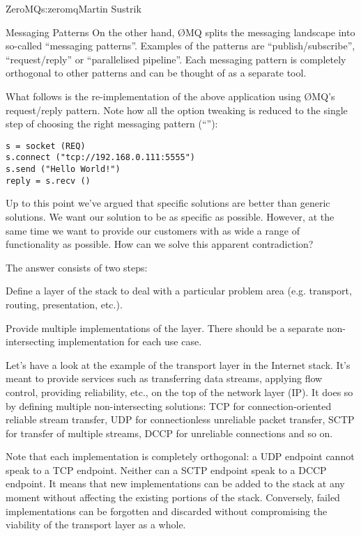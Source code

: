 \begin{aosachapter}{ZeroMQ}{s:zeromq}{Martin Sustrik}
\begin{aosasect1}{Messaging Patterns}
On the other hand, {\O}MQ splits the messaging landscape into so-called ``messaging
patterns''. Examples of the patterns are ``publish/subscribe'',
``request/reply'' or ``parallelised pipeline''. Each messaging pattern
is completely orthogonal to other patterns and can be thought of as a
separate tool.

What follows is the re-implementation of the above application using
{\O}MQ's request/reply pattern. Note how all the option tweaking is
reduced to the single step of choosing the right messaging pattern
(``''):

\begin{verbatim}
s = socket (REQ)
s.connect ("tcp://192.168.0.111:5555")
s.send ("Hello World!")
reply = s.recv ()
\end{verbatim}

Up to this point we've argued that specific solutions are better than
generic solutions. We want our solution to be as specific as
possible. However, at the same time we want to provide our customers
with as wide a range of functionality as possible. How can we solve this
apparent contradiction?

The answer consists of two steps:

\begin{aosaenumerate}

\item Define a layer of the stack to deal with a particular problem
  area (e.g. transport, routing, presentation, etc.).

\item Provide multiple implementations of the layer. There should be a
  separate non-intersecting implementation for each use case.

\end{aosaenumerate}

Let's have a look at the example of the transport layer in the
Internet stack. It's meant to provide services such as transferring
data streams, applying flow control, providing reliability, etc., on the
top of the network layer (IP). It does so by defining multiple
non-intersecting solutions: TCP for connection-oriented reliable
stream transfer, UDP for connectionless unreliable packet transfer,
SCTP for transfer of multiple streams, DCCP for unreliable connections
and so on.

Note that each implementation is completely orthogonal: a UDP endpoint
cannot speak to a TCP endpoint. Neither can a SCTP endpoint speak to a DCCP
endpoint. It means that new implementations can be added to the stack
at any moment without affecting the existing portions of the
stack. Conversely, failed implementations can be forgotten and
discarded without compromising the viability of the transport layer as a
whole.


\end{aosasect1}
\end{aosachapter}
